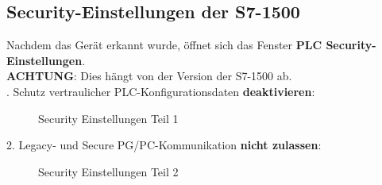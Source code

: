 \clearpage

\subsection{Security-Einstellungen der S7-1500}
Nachdem das Gerät erkannt wurde, öffnet sich das Fenster \textbf{PLC Security-Einstellungen}.\\
\textbf{ACHTUNG}: Dies hängt von der Version der S7-1500 ab.\\
. Schutz vertraulicher PLC-Konfigurationsdaten \textbf{deaktivieren}:
\begin{figure}[H]
   \centering
   \caption[Security Einstellungen Teil 1]{Security Einstellungen Teil 1}
   \label{fig:Bild3.7}
\end{figure}

\clearpage

2. Legacy- und Secure PG/PC-Kommunikation \textbf{nicht zulassen}:
\begin{figure}[H]
   \centering
   \caption[Security Einstellungen Teil 2]{Security Einstellungen Teil 2}
   \label{fig:Bild3.8}
\end{figure}

